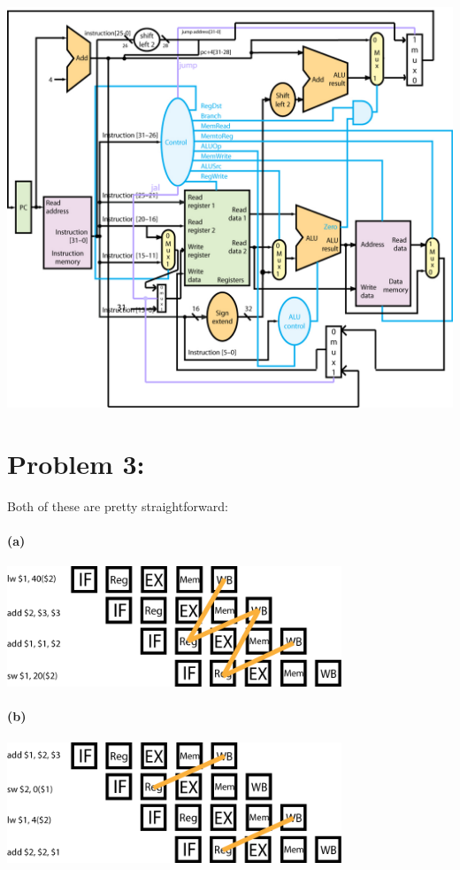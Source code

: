 \documentclass[a4paper]{article}
\begin{document}
\includegraphics[width=150mm]{cpu.png}

\section{Problem 3:}

Both of these are pretty straightforward:

\paragraph{(a) \\} \includegraphics[width=100mm]{p3_a.png}

\paragraph{(b) \\} \includegraphics[width=100mm]{p3_b.png}
\end{document}
